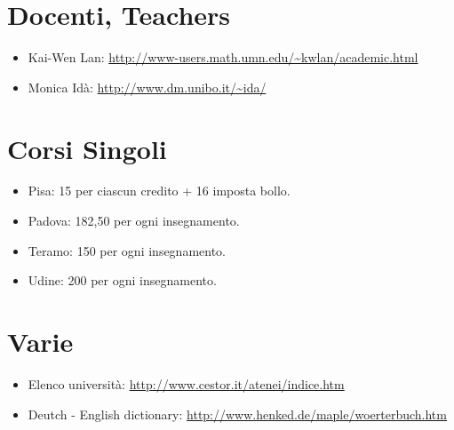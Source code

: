 \documentclass[a4paper,10pt]{article}
\begin{document}
\section{Docenti, Teachers}
\begin{itemize}
 \item Kai-Wen Lan: \url{http://www-users.math.umn.edu/~kwlan/academic.html}
 \item Monica Idà: \url{http://www.dm.unibo.it/~ida/}
\end{itemize}


\section{Corsi Singoli}
\begin{itemize}
 \item Pisa: 15 per ciascun credito + 16 imposta bollo.
 \item Padova: 182,50 per ogni insegnamento.
 \item Teramo: 150 per ogni insegnamento.
 \item Udine: 200 per ogni insegnamento. 
\end{itemize}

\section{Varie}
\begin{itemize}
 \item Elenco università: \url{http://www.cestor.it/atenei/indice.htm}
 \item Deutch - English dictionary: \url{http://www.henked.de/maple/woerterbuch.htm}
\end{itemize}
\end{document}
